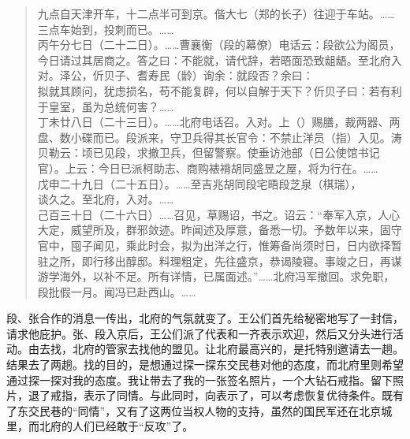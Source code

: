 \begin{quote}
	九点自天津开车，十二点半可到京。偕大七（郑的长子）往迎于车站。……三点车始到，投刺而已。……\\

丙午分七日（二十二日）。……曹襄衡（段的幕僚）电话云：段欲公为阁员，今日请过其居商之。答之曰：不能就，请代辞，若晤面恐致龃龉。至北府入对。泽公，伒贝子、耆寿民（龄）询余：就段否？余曰：\\

拟就其顾问，犹虑损名，苟不能复辟，何以自解于天下？伒贝子曰：若有利于皇室，虽为总统何害？……\\

丁未廿八日（二十三日）。……北府电话召。入对。上（）赐膳，裁两器、两盘、数小碟而已。段派来，守卫兵得其长官令：不禁止洋员（指）入见。涛贝勒云：顷已见段，求撤卫兵，但留警察。使垂访池部（日公使馆书记官）。上云：今日已派柯助志、商购裱褙胡同盛昱之屋，将为行在。……\\

戊申二十九日（二十五日）。……至吉兆胡同段宅晤段芝泉（棋瑞），\\

谈久之。至北府，入对。……\\

己百三十日（二十六日）……召见，草赐诏，书之。诏云：“奉军入京，人心大定，威望所及，群邪敛迹。昨闻述及厚意，备悉一切。予数年以来，固守官中，囤子闻见，乘此时会，拟为出洋之行，惟筹备尚须时日，日内欲择暂驻之所，即行移出醇邸。料理粗定，先往盛京，恭谒陵寝。事竣之日，再谋游学海外，以补不足。所有详情，已属面述。”……北府冯军撤回。求免职，段批假一月。闻冯已赴西山。……\\
\end{quote}

段、张合作的消息一传出，北府的气氛就变了。王公们首先给秘密地写了一封信，请求他庇护。张、段入京后，王公们派了代表和一齐表示欢迎，然后又分头进行活动。由去找，北府的管家去找他的盟见。让北府最高兴的，是托特别邀请去一趟。结果去了两趟。找的目的，是想通过探一探东交民巷对他的态度，而北府里则希望通过探一探对我的态度。我让带去了我的一张签名照片，一个大钻石戒指。留下照片，退了戒指，表示了同情。与此同时，向表示了，可以考虑恢复优待条件。既有了东交民巷的“同情”，又有了这两位当权人物的支持，虽然的国民军还在北京城里，而北府的人们已经敢于“反攻”了。\\

